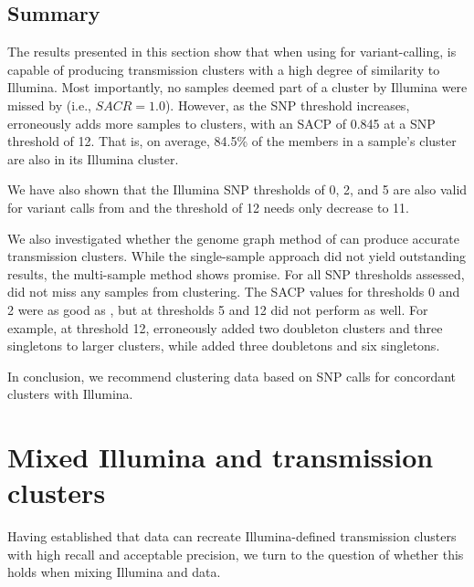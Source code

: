 \subsection{Summary}
\label{sec:cluster-summary}

The results presented in this section show that when using \bcftools{} for variant-calling, \ont{} is capable of producing transmission clusters with a high degree of similarity to Illumina. Most importantly, no samples deemed part of a cluster by Illumina were missed by \bcftools{} (i.e., $SACR=1.0$). However, as the SNP threshold increases, \bcftools{} erroneously adds more samples to clusters, with an SACP of 0.845 at a SNP threshold of 12. That is, on average, 84.5\% of the members in a sample's \ont{} cluster are also in its Illumina cluster. 

We have also shown that the Illumina SNP thresholds of 0, 2, and 5 are also valid for \ont{} variant calls from \bcftools{} and the threshold of 12 needs only decrease to 11. 

We also investigated whether the genome graph method of \pandora{} can produce accurate transmission clusters. While the single-sample approach did not yield outstanding results, the multi-sample method shows promise. For all SNP thresholds assessed, \compare{} did not miss any samples from clustering. The SACP values for thresholds 0 and 2 were as good as \bcftools{}, but at thresholds 5 and 12 \compare{} did not perform as well. For example, at threshold 12, \bcftools{} erroneously added two doubleton clusters and three singletons to larger clusters, while \compare{} added three doubletons and six singletons.

\noindent
In conclusion, we recommend clustering \ont{} data based on \bcftools{} SNP calls for concordant clusters with Illumina.


\section{Mixed Illumina and \ont{} transmission clusters}
\label{sec:mixed-clustering}

Having established that \ont{} data can recreate Illumina-defined transmission clusters with high recall and acceptable precision, we turn to the question of whether this holds when mixing Illumina and \ont{} data. 

